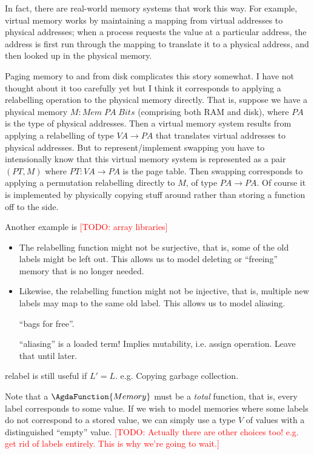 \documentclass{jfp}
\newcommand{\todo}[1]{\textcolor{red}{[TODO: #1]}}
\newcommand{\todo}[1]{}
\begin{document}
In fact, there are real-world memory systems that work this way.  For
example, virtual memory works by maintaining a mapping from virtual
addresses to physical addresses; when a process requests the value at
a particular address, the address is first run through the mapping to
translate it to a physical address, and then looked up in the physical
memory.
\begin{commentary}
  Paging memory to and from disk complicates this story somewhat.  I
  have not thought about it too carefully yet but I think it
  corresponds to applying a relabelling operation to the physical
  memory directly.  That is, suppose we have a physical memory
  $M : Mem\; PA\; Bits$ (comprising both RAM and disk), where $PA$ is
  the type of physical addresses.  Then a virtual memory system
  results from applying a relabelling of type $VA \to PA$ that
  translates virtual addresses to physical addresses.  But to
  represent/implement swapping you have to intensionally know that
  this virtual memory system is represented as a pair $(PT, M)$ where
  $PT : VA \to PA$ is the page table.  Then swapping corresponds to
  applying a permutation relabelling directly to $M$, of type
  $PA \to PA$.  Of course it is implemented by physically copying
  stuff around rather than storing a function off to the side.
\end{commentary}
Another example is \todo{array libraries}

\begin{itemize}
\item The relabelling function might not be surjective, that is, some
  of the old labels might be left out. This allows us to model
  deleting or ``freeing'' memory that is no longer needed.
\item Likewise, the relabelling function might not be injective, that
  is, multiple new labels may map to the same old label.  This allows
  us to model aliasing.

  ``bags for free''.

  ``aliasing'' is a loaded term!  Implies mutability, i.e. assign
  operation.  Leave that until later.
\end{itemize}

\begin{commentary}
  relabel is still useful if $L' = L$.  e.g. Copying garbage collection.
\end{commentary}

\begin{commentary}
Note that a $\AgdaFunction{Memory}$ must be a \emph{total} function,
that is, every label corresponds to some value.  If we wish to model
memories where some labels do not correspond to a stored value, we can
simply use a type $V$ of values with a distinguished ``empty'' value.
\todo{Actually there are other choices too!  e.g. get rid of labels
  entirely.  This is why we're going to wait.}
\end{commentary}
\end{document}
